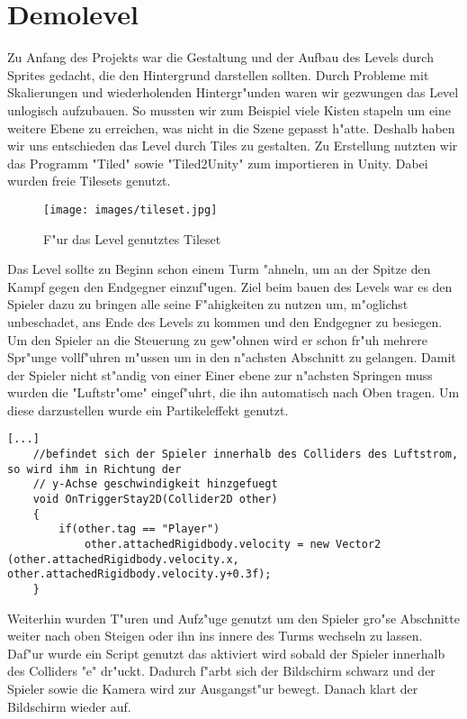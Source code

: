 \chapter{Demolevel}
Zu Anfang des Projekts war die Gestaltung und der Aufbau des Levels durch Sprites gedacht, die den Hintergrund darstellen sollten. Durch Probleme mit Skalierungen und wiederholenden Hintergr"unden waren wir gezwungen das Level unlogisch aufzubauen. So mussten wir zum Beispiel viele Kisten stapeln um eine weitere Ebene zu erreichen, was nicht in die Szene gepasst h"atte. Deshalb haben wir uns entschieden das Level durch Tiles zu gestalten. Zu Erstellung nutzten wir das Programm "Tiled" sowie "Tiled2Unity" zum importieren in Unity. Dabei wurden freie Tilesets genutzt.

\begin{figure}
	\centering
	\texttt{[image: images/tileset.jpg]}
	\caption{F"ur das Level genutztes Tileset}
	\label{fig:screen_pre}
\end{figure}


Das Level sollte zu Beginn schon einem Turm "ahneln, um an der Spitze den Kampf gegen den Endgegner einzuf"ugen. Ziel beim bauen des Levels war es den Spieler dazu zu bringen alle seine F"ahigkeiten zu nutzen um, m"oglichst unbeschadet, ans Ende des Levels zu kommen und den Endgegner zu besiegen.
Um den Spieler an die Steuerung zu gew"ohnen wird er schon fr"uh mehrere Spr"unge vollf"uhren m"ussen um in den n"achsten Abschnitt zu gelangen. Damit der Spieler nicht st"andig von einer Einer ebene zur n"achsten Springen muss wurden die "Luftstr"ome" eingef"uhrt, die ihn automatisch nach Oben tragen. Um diese darzustellen wurde ein Partikeleffekt genutzt.


\begin{lstlisting}[breaklines=true]
	[...]
	//befindet sich der Spieler innerhalb des Colliders des Luftstrom, so wird ihm in Richtung der
	// y-Achse geschwindigkeit hinzgefuegt
	void OnTriggerStay2D(Collider2D other)
	{
		if(other.tag == "Player")
			other.attachedRigidbody.velocity = new Vector2 (other.attachedRigidbody.velocity.x, other.attachedRigidbody.velocity.y+0.3f);
	}
\end{lstlisting}

Weiterhin wurden T"uren und Aufz"uge genutzt um den Spieler gro"se Abschnitte weiter nach oben Steigen oder ihn ins innere des Turms wechseln zu lassen. Daf"ur wurde ein Script genutzt das aktiviert wird sobald der Spieler innerhalb des Colliders "e" dr"uckt. Dadurch f"arbt sich der Bildschirm schwarz und der Spieler sowie die Kamera wird zur Ausgangst"ur bewegt. Danach klart der Bildschirm wieder auf.

